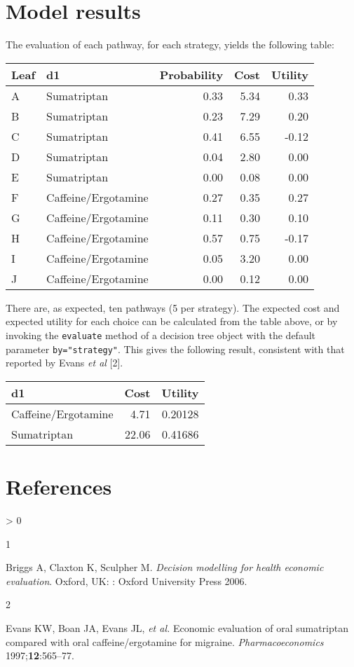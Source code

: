 \documentclass[
]{article}
\newlength{\cslhangindent}
\newlength{\csllabelwidth}
\newenvironment{CSLReferences}[2] %
 {%
  \setlength{\parindent}{0pt}
  \ifodd #1 \everypar{\setlength{\hangindent}{\cslhangindent}}\ignorespaces\fi
  \ifnum #2 > 0
  \setlength{\parskip}{#2\baselineskip}
  \fi
 }%
 {}
\newcommand{\CSLLeftMargin}[1]{\parbox[t]{\csllabelwidth}{#1}}
\newcommand{\CSLRightInline}[1]{\parbox[t]{\linewidth - \csllabelwidth}{#1}\break}
\begin{document}
\hypertarget{model-results}{%
\section{Model results}\label{model-results}}

The evaluation of each pathway, for each strategy, yields the following
table:

\begin{longtable}[]{@{}llrrr@{}}
\toprule
Leaf & d1 & Probability & Cost & Utility\tabularnewline
\midrule
\endhead
A & Sumatriptan & 0.33 & 5.34 & 0.33\tabularnewline
B & Sumatriptan & 0.23 & 7.29 & 0.20\tabularnewline
C & Sumatriptan & 0.41 & 6.55 & -0.12\tabularnewline
D & Sumatriptan & 0.04 & 2.80 & 0.00\tabularnewline
E & Sumatriptan & 0.00 & 0.08 & 0.00\tabularnewline
F & Caffeine/Ergotamine & 0.27 & 0.35 & 0.27\tabularnewline
G & Caffeine/Ergotamine & 0.11 & 0.30 & 0.10\tabularnewline
H & Caffeine/Ergotamine & 0.57 & 0.75 & -0.17\tabularnewline
I & Caffeine/Ergotamine & 0.05 & 3.20 & 0.00\tabularnewline
J & Caffeine/Ergotamine & 0.00 & 0.12 & 0.00\tabularnewline
\bottomrule
\end{longtable}

There are, as expected, ten pathways (5 per strategy). The expected cost
and expected utility for each choice can be calculated from the table
above, or by invoking the \texttt{evaluate} method of a decision tree
object with the default parameter \texttt{by="strategy"}. This gives the
following result, consistent with that reported by Evans \emph{et al}
{[}2{]}.

\begin{longtable}[]{@{}lrr@{}}
\toprule
d1 & Cost & Utility\tabularnewline
\midrule
\endhead
Caffeine/Ergotamine & 4.71 & 0.20128\tabularnewline
Sumatriptan & 22.06 & 0.41686\tabularnewline
\bottomrule
\end{longtable}

\hypertarget{references}{%
\section*{References}\label{references}}

\hypertarget{refs}{}
\begin{CSLReferences}{0}{0}
\leavevmode\hypertarget{ref-briggs2006}{}%
\CSLLeftMargin{1 }
\CSLRightInline{Briggs A, Claxton K, Sculpher M. \emph{Decision
modelling for health economic evaluation}. Oxford, {UK}: : Oxford
University Press 2006. }

\leavevmode\hypertarget{ref-evans1997}{}%
\CSLLeftMargin{2 }
\CSLRightInline{Evans KW, Boan JA, Evans JL, \emph{et al.} Economic
evaluation of oral sumatriptan compared with oral caffeine/ergotamine
for migraine. \emph{Pharmacoeconomics} 1997;\textbf{12}:565--77.}

\end{CSLReferences}
\end{document}
